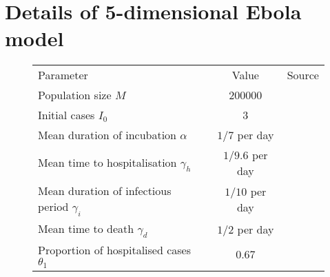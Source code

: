 \section{Details of 5-dimensional Ebola model}\label{app:ebola}
	\begin{figure}
		\begin{center}
			\begin{tabular}{|p{5cm}|c|p{5cm}|}
				\hline
				Parameter                                                               & Value               & Source                                                                                                                                 \\ \hhline{|=|=|=|}
				Population size \(M\)                                                   & 200000              & \citet{DowellEtAl_1999_TransmissionEbolaHemorrhagic}                                                                                   \\ \hline
				Initial cases \(I_0\)                                                   & 3                   & \citet{KhanEtAl_1999_ReemergenceEbolaHemorrhagic}                                                                                      \\ \hline
				Mean duration of incubation	\(\alpha\)                                  & \(1 / 7\) per day   & \citet{DowellEtAl_1999_TransmissionEbolaHemorrhagic,BwakaEtAl_1999_EbolaHemorrhagicFever,NdambiEtAl_1999_EpidemiologicClinicalAspects} \\ \hline
				Mean time to hospitalisation \(\gamma_h\)                               & \(1 / 9.6\) per day & \citet{KhanEtAl_1999_ReemergenceEbolaHemorrhagic}                                                                                      \\ \hline
				Mean duration of infectious period \(\gamma_i\)                         & \(1 / 10\) per day  & \citet{DowellEtAl_1999_TransmissionEbolaHemorrhagic,RoweEtAl_1999_ClinicalVirologicImmunologic}                                        \\
				Mean time to death \(\gamma_d\)                                         & \(1 / 2\) per day   & \citet{KhanEtAl_1999_ReemergenceEbolaHemorrhagic}                                                                                      \\ \hline
				Proportion of hospitalised cases \(\theta_1\)                           & \(0.67\)            & \citet{KhanEtAl_1999_ReemergenceEbolaHemorrhagic}                                                                                      \\ \hline

\end{tabular}
\end{center}
\end{figure}
